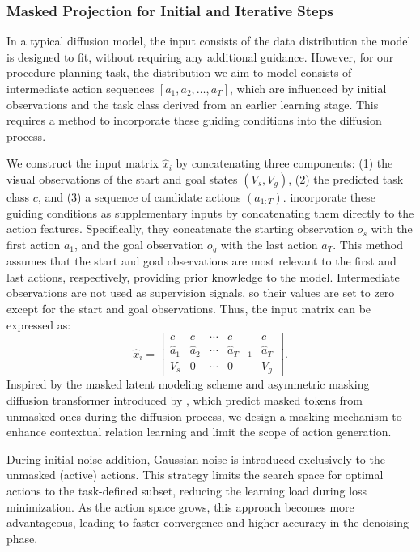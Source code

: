 \subsubsection{Masked Projection for Initial and Iterative Steps}
In a typical diffusion model, the input consists of the data distribution the model is designed to fit, without requiring any additional guidance. However, for our procedure planning task, the distribution we aim to model consists of intermediate action sequences \([a_1, a_2, \dots, a_T]\), which are influenced by initial observations and the task class derived from an earlier learning stage. This requires a method to incorporate these guiding conditions into the diffusion process.

We construct the input matrix \( \hat{x}_i \) by concatenating three components: (1) the visual observations of the start and goal states \((V_s, V_g)\), (2) the predicted task class \( c \), and (3) a sequence of candidate actions \((a_{1:T})\). \citet{wang2023pdpp} incorporate these guiding conditions as supplementary inputs by concatenating them directly to the action features. Specifically, they concatenate the starting observation \( o_s \) with the first action \( a_1 \), and the goal observation \( o_g \) with the last action \( a_T \). This method assumes that the start and goal observations are most relevant to the first and last actions, respectively, providing prior knowledge to the model. Intermediate observations are not used as supervision signals, so their values are set to zero except for the start and goal observations. Thus, the input matrix can be expressed as:
\begin{equation}
    \hat{x}_i = \begin{bmatrix}  
        c & c & \cdots & c & c \\  
        \hat{a}_1 & \hat{a}_2 & \cdots & \hat{a}_{T-1} & \hat{a}_T \\  
        V_s & 0 & \cdots & 0 & V_g
    \end{bmatrix}.
\end{equation}
Inspired by the masked latent modeling scheme and asymmetric masking diffusion transformer introduced by \citet{gao2023masked}, which predict masked tokens from unmasked ones during the diffusion process, we design a masking mechanism to enhance contextual relation learning and limit the scope of action generation.

During initial noise addition, Gaussian noise is introduced exclusively to the unmasked (active) actions. This strategy limits the search space for optimal actions to the task-defined subset, reducing the learning load during loss minimization. As the action space grows, this approach becomes more advantageous, leading to faster convergence and higher accuracy in the denoising phase.

